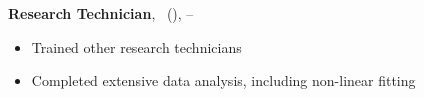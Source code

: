 \textbf{Research Technician}, \UWW \ (\UlocA),  -- \\
\begin{itemize} 
\item Trained other research technicians %
\item Completed extensive data analysis, including non-linear fitting\\
\end{itemize} 
\ \\


